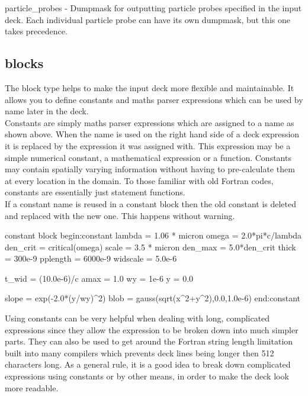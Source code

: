 {\emphtext particle\_probes} - Dumpmask for outputting particle probes
specified in the input deck. Each individual particle probe
can have its own dumpmask, but this one takes precedence.\\


\subsection{ blocks}

The  block type helps to make the input deck more flexible
and maintainable. It allows you to define constants and maths parser
expressions which can be used by name later in the deck.\\

Constants are simply maths parser expressions which are assigned to a name as
shown above. When the name is used on the right hand side of a deck expression
it is replaced by the expression it was assigned with. This expression may
be a simple numerical constant, a mathematical expression or a function.
Constants may contain spatially varying information without having to
pre-calculate them at every location in the domain.
To those familiar with old Fortran codes, constants are essentially just
statement functions.\\

If a constant name is reused in a constant block then the old constant is
deleted and replaced with the new one. This happens without warning.\\

\begin{lboxverbatim}{constant block}
begin:constant
   lambda = 1.06 * micron
   omega = 2.0*pi*c/lambda
   den_crit = critical(omega)
   scale = 3.5 * micron
   den_max = 5.0*den_crit
   thick = 300e-9
   pplength = 6000e-9
   widscale = 5.0e-6

   t_wid = (10.0e-6)/c
   amax = 1.0
   wy = 1e-6
   y = 0.0

   slope = exp(-2.0*(y/wy)^2)
   blob = gauss(sqrt(x^2+y^2),0.0,1.0e-6)
end:constant
\end{lboxverbatim}

Using constants can be very helpful when dealing with long,
complicated expressions since they allow the expression to be broken down into
much simpler parts. They can also be used to get around the Fortran string
length limitation built into many compilers which prevents deck lines being
longer then 512 characters long. As a general rule, it is a good idea to break
down complicated expressions using constants or by other means, in order to
make the deck look more readable.\\

